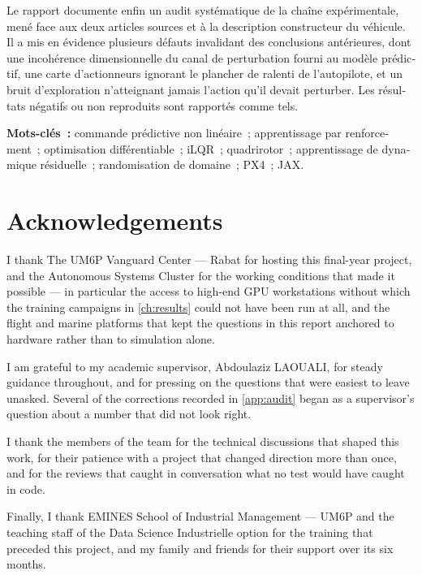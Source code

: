 \documentclass[11pt,a4paper,twoside,openright]{report}
\newenvironment{frenchpart}{\begin{otherlanguage}{french}}{\end{otherlanguage}}%
\newenvironment{frenchpart}{}{}%
\newcommand{\SchoolName}{EMINES School of Industrial Management --- UM6P}
\newcommand{\OptionName}{Data Science Industrielle}
\newcommand{\HostOrg}{The UM6P Vanguard Center --- Rabat}
\newcommand{\HostTeam}{Autonomous Systems Cluster}
\newcommand{\AcademicSupervisor}{Abdoulaziz LAOUALI}
\theoremstyle{plain}
\theoremstyle{definition}
\theoremstyle{remark}
\begin{document}
\begin{frenchpart}
		Le rapport documente enfin un audit syst\'ematique de la cha\^ine
		exp\'erimentale, men\'e face aux deux articles sources et \`a la description
		constructeur du v\'ehicule. Il a mis en \'evidence plusieurs d\'efauts
		invalidant des conclusions ant\'erieures, dont une incoh\'erence
		dimensionnelle du canal de perturbation fourni au mod\`ele pr\'edictif, une
		carte d'actionneurs ignorant le plancher de ralenti de l'autopilote, et un
		bruit d'exploration n'atteignant jamais l'action qu'il devait perturber. Les
		r\'esultats n\'egatifs ou non reproduits sont rapport\'es comme tels.

		\vspace{4mm}
		\noindent\textbf{Mots-cl\'es~:} commande pr\'edictive non lin\'eaire~;
		apprentissage par renforcement~; optimisation diff\'erentiable~; iLQR~;
		quadrirotor~; apprentissage de dynamique r\'esiduelle~; randomisation de
		domaine~; PX4~; JAX.
	\end{frenchpart}

	\cleardoublepage

	\chapter*{Acknowledgements}
	I thank \HostOrg{} for hosting this final-year project, and the
	\HostTeam{} for the working conditions that made it possible --- in
	particular the access to high-end GPU workstations without which the
	training campaigns in \cref{ch:results} could not have been run at all, and
	the flight and marine platforms that kept the questions in this report
	anchored to hardware rather than to simulation alone.

	I am grateful to my academic supervisor, \AcademicSupervisor, for steady
	guidance throughout, and for pressing on the questions that were easiest to
	leave unasked. Several of the corrections recorded in \cref{app:audit}
	began as a supervisor's question about a number that did not look right.

	I thank the members of the team for the technical discussions that shaped
	this work, for their patience with a project that changed direction more
	than once, and for the reviews that caught in conversation what no test
	would have caught in code.

	Finally, I thank \SchoolName{} and the teaching staff of the
	\OptionName{} option for the training that preceded this project, and my
	family and friends for their support over its six months.
\end{document}
